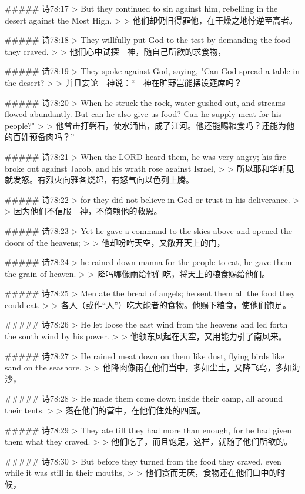 ##### 诗78:17
> But they continued to sin against him, rebelling in the desert against the Most High.
>
> 他们却仍旧得罪他，在干燥之地悖逆至高者。


##### 诗78:18
> They willfully put God to the test by demanding the food they craved.
>
> 他们心中试探　神，随自己所欲的求食物，


##### 诗78:19
> They spoke against God, saying, "Can God spread a table in the desert?
>
> 并且妄论　神说：“　神在旷野岂能摆设筵席吗？


##### 诗78:20
> When he struck the rock, water gushed out, and streams flowed abundantly. But can he also give us food? Can he supply meat for his people?"
>
> 他曾击打磐石，使水涌出，成了江河。他还能赐粮食吗？还能为他的百姓预备肉吗？”


##### 诗78:21
> When the LORD heard them, he was very angry; his fire broke out against Jacob, and his wrath rose against Israel,
>
> 所以耶和华听见就发怒。有烈火向雅各烧起，有怒气向以色列上腾。


##### 诗78:22
> for they did not believe in God or trust in his deliverance.
>
> 因为他们不信服　神，不倚赖他的救恩。


##### 诗78:23
> Yet he gave a command to the skies above and opened the doors of the heavens;
>
> 他却吩咐天空，又敞开天上的门，


##### 诗78:24
> he rained down manna for the people to eat, he gave them the grain of heaven.
>
> 降吗哪像雨给他们吃，将天上的粮食赐给他们。


##### 诗78:25
> Men ate the bread of angels; he sent them all the food they could eat.
>
> 各人（或作“人”）吃大能者的食物。他赐下粮食，使他们饱足。


##### 诗78:26
> He let loose the east wind from the heavens and led forth the south wind by his power.
>
> 他领东风起在天空，又用能力引了南风来。


##### 诗78:27
> He rained meat down on them like dust, flying birds like sand on the seashore.
>
> 他降肉像雨在他们当中，多如尘土，又降飞鸟，多如海沙，


##### 诗78:28
> He made them come down inside their camp, all around their tents.
>
> 落在他们的营中，在他们住处的四面。


##### 诗78:29
> They ate till they had more than enough, for he had given them what they craved.
>
> 他们吃了，而且饱足。这样，就随了他们所欲的。


##### 诗78:30
> But before they turned from the food they craved, even while it was still in their mouths,
>
> 他们贪而无厌，食物还在他们口中的时候，



